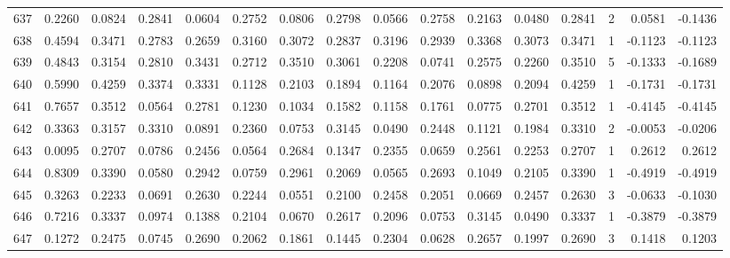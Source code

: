\begin{tabular}{lrrrrrrrrrrrrrrr}
637 &      0.2260 &  0.0824 &  0.2841 &  0.0604 &  0.2752 &  0.0806 &  0.2798 &  0.0566 &  0.2758 &  0.2163 &   0.0480 &     0.2841 &      2 &                    0.0581 &                    -0.1436 \\
638 &      0.4594 &  0.3471 &  0.2783 &  0.2659 &  0.3160 &  0.3072 &  0.2837 &  0.3196 &  0.2939 &  0.3368 &   0.3073 &     0.3471 &      1 &                   -0.1123 &                    -0.1123 \\
639 &      0.4843 &  0.3154 &  0.2810 &  0.3431 &  0.2712 &  0.3510 &  0.3061 &  0.2208 &  0.0741 &  0.2575 &   0.2260 &     0.3510 &      5 &                   -0.1333 &                    -0.1689 \\
640 &      0.5990 &  0.4259 &  0.3374 &  0.3331 &  0.1128 &  0.2103 &  0.1894 &  0.1164 &  0.2076 &  0.0898 &   0.2094 &     0.4259 &      1 &                   -0.1731 &                    -0.1731 \\
641 &      0.7657 &  0.3512 &  0.0564 &  0.2781 &  0.1230 &  0.1034 &  0.1582 &  0.1158 &  0.1761 &  0.0775 &   0.2701 &     0.3512 &      1 &                   -0.4145 &                    -0.4145 \\
642 &      0.3363 &  0.3157 &  0.3310 &  0.0891 &  0.2360 &  0.0753 &  0.3145 &  0.0490 &  0.2448 &  0.1121 &   0.1984 &     0.3310 &      2 &                   -0.0053 &                    -0.0206 \\
643 &      0.0095 &  0.2707 &  0.0786 &  0.2456 &  0.0564 &  0.2684 &  0.1347 &  0.2355 &  0.0659 &  0.2561 &   0.2253 &     0.2707 &      1 &                    0.2612 &                     0.2612 \\
644 &      0.8309 &  0.3390 &  0.0580 &  0.2942 &  0.0759 &  0.2961 &  0.2069 &  0.0565 &  0.2693 &  0.1049 &   0.2105 &     0.3390 &      1 &                   -0.4919 &                    -0.4919 \\
645 &      0.3263 &  0.2233 &  0.0691 &  0.2630 &  0.2244 &  0.0551 &  0.2100 &  0.2458 &  0.2051 &  0.0669 &   0.2457 &     0.2630 &      3 &                   -0.0633 &                    -0.1030 \\
646 &      0.7216 &  0.3337 &  0.0974 &  0.1388 &  0.2104 &  0.0670 &  0.2617 &  0.2096 &  0.0753 &  0.3145 &   0.0490 &     0.3337 &      1 &                   -0.3879 &                    -0.3879 \\
647 &      0.1272 &  0.2475 &  0.0745 &  0.2690 &  0.2062 &  0.1861 &  0.1445 &  0.2304 &  0.0628 &  0.2657 &   0.1997 &     0.2690 &      3 &                    0.1418 &                     0.1203 \\

\end{tabular}
